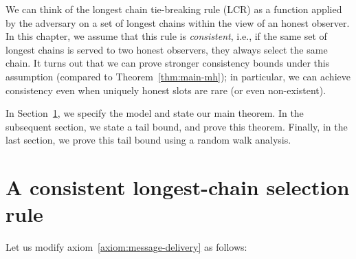 We can think of the longest chain tie-breaking rule (LCR) 
as a function applied by the adversary on a set of longest chains within the view of an honest observer. 
In this chapter, 
we assume that this rule is \emph{consistent}, i.e., 
if the same set of longest chains is served to two honest observers, 
they always select the same chain. 
It turns out that 
we can prove stronger consistency bounds under this assumption 
(compared to Theorem~\ref{thm:main-mh}); 
in particular, we can achieve consistency even when 
uniquely honest slots are rare (or even non-existent).

In Section~\ref{sec:lcr-model}, we specify the model and state our main theorem. 
In the subsequent section, we state a tail bound, and prove this theorem. 
Finally, in the last section, we prove this tail bound using a random walk analysis.

\section{A consistent longest-chain selection rule}\label{sec:lcr-model} 

  Let us 
  modify axiom~\ref{axiom:message-delivery} as follows:

